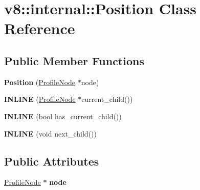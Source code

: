 \hypertarget{classv8_1_1internal_1_1_position}{}\section{v8\+:\+:internal\+:\+:Position Class Reference}
\label{classv8_1_1internal_1_1_position}
\subsection*{Public Member Functions}
\begin{DoxyCompactItemize}
\item 
{\bfseries Position} (\hyperlink{classv8_1_1internal_1_1_profile_node}{Profile\+Node} $\ast$node)\hypertarget{classv8_1_1internal_1_1_position_abe904a2351771f5689f89c648353c29c}{}\label{classv8_1_1internal_1_1_position_abe904a2351771f5689f89c648353c29c}

\item 
{\bfseries I\+N\+L\+I\+NE} (\hyperlink{classv8_1_1internal_1_1_profile_node}{Profile\+Node} $\ast$current\+\_\+child())\hypertarget{classv8_1_1internal_1_1_position_ad8ac4d8275ccaa7fb3b2edf97ae46aa8}{}\label{classv8_1_1internal_1_1_position_ad8ac4d8275ccaa7fb3b2edf97ae46aa8}

\item 
{\bfseries I\+N\+L\+I\+NE} (bool has\+\_\+current\+\_\+child())\hypertarget{classv8_1_1internal_1_1_position_a8d622bb9deb8676f2ab033758d8de110}{}\label{classv8_1_1internal_1_1_position_a8d622bb9deb8676f2ab033758d8de110}

\item 
{\bfseries I\+N\+L\+I\+NE} (void next\+\_\+child())\hypertarget{classv8_1_1internal_1_1_position_a8b588adecd9cc4e4a8979d30c216e634}{}\label{classv8_1_1internal_1_1_position_a8b588adecd9cc4e4a8979d30c216e634}

\end{DoxyCompactItemize}
\subsection*{Public Attributes}
\begin{DoxyCompactItemize}
\item 
\hyperlink{classv8_1_1internal_1_1_profile_node}{Profile\+Node} $\ast$ {\bfseries node}\hypertarget{classv8_1_1internal_1_1_position_a59842d5a15c7578368190dccf7aa323a}{}\label{classv8_1_1internal_1_1_position_a59842d5a15c7578368190dccf7aa323a}

\end{DoxyCompactItemize}
